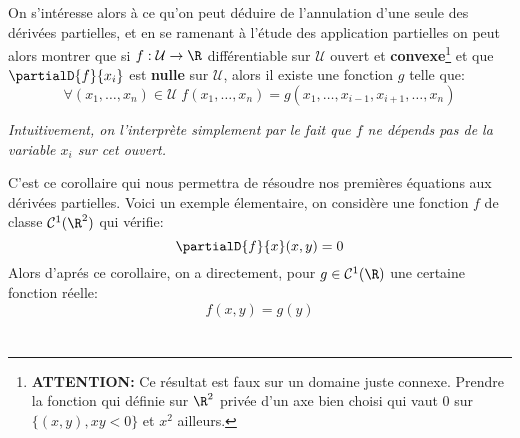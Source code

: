 \subsection*{}
On s'intéresse alors à ce qu'on peut déduire de l'annulation d'une seule des dérivées partielles, et en se ramenant à l'étude des application partielles on peut alors montrer que si \(f : \mathcal{U} \rightarrow \R\) différentiable sur \(\mathcal{U}\) ouvert et \textbf{convexe}\footnote[2]{\textbf{ATTENTION:} Ce résultat est faux sur un domaine juste connexe. Prendre la fonction qui définie sur \(\R^2\) privée d'un axe bien choisi qui vaut \(0\) sur \(\{ (x, y), xy < 0\}\) et \(x^2\) ailleurs.} et que \(\partialD{f}{x_i}\) est \textbf{nulle} sur \(\mathcal{U}\), alors il existe une fonction \(g\) telle que:
\[
   \forall (x_1, \ldots, x_n) \in \mathcal{U} \; f(x_1, \ldots, x_n) = g(x_1, \ldots, x_{i-1}, x_{i+1}, \ldots, x_n) 
\]
\begin{center}
   \textit{Intuitivement, on l'interprète simplement par le fait que \(f\) ne dépends pas de la variable \(x_i\) sur cet ouvert.}
\end{center}
C'est ce corollaire qui nous permettra de résoudre nos premières équations aux dérivées partielles. Voici un exemple élementaire, on considère une fonction \(f\) de classe \(\mathcal{C}^1(\R^2)\) qui vérifie:
\[
   \partialD{f}{x}(x, y) = 0   
\]
Alors d'aprés ce corollaire, on a directement, pour \(g \in \mathcal{C}^1(\R)\) une certaine fonction réelle:
\[
   f(x, y) = g(y)   
\]

\chapter*{}


\chapter*{}

